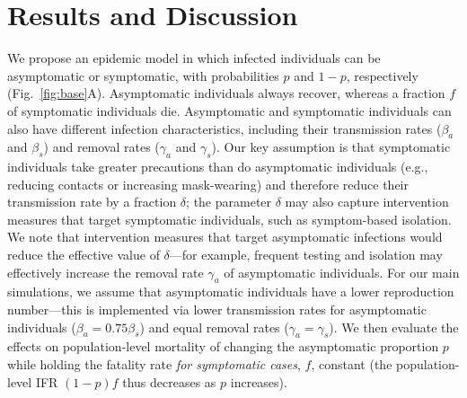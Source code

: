 \documentclass[12pt]{article}
\newcommand{\fref}[1]{Fig.~\ref{fig:#1}}
\begin{document}
\section*{Results and Discussion}

We propose an epidemic model in which infected individuals can be asymptomatic or symptomatic, with probabilities $p$ and $1-p$, respectively (\fref{base}A).  
Asymptomatic individuals always recover, whereas a fraction $f$ of symptomatic individuals die.
Asymptomatic and symptomatic individuals can also have different infection characteristics, including their transmission rates ($\beta_a$ and $\beta_s$) and removal rates ($\gamma_a$ and $\gamma_s$).
Our key assumption is that symptomatic individuals take greater precautions than do asymptomatic individuals (e.g., reducing contacts or increasing mask-wearing) and therefore reduce their transmission rate by a fraction $\delta$;
the parameter $\delta$ may also capture intervention measures that target symptomatic individuals, such as symptom-based isolation. 
We note that intervention measures that target asymptomatic infections would reduce the effective value of $\delta$---for example, frequent testing and isolation may effectively increase the removal rate $\gamma_a$ of asymptomatic individuals.
For our main simulations, we assume that asymptomatic individuals have a lower reproduction number---this is implemented via lower transmission rates for asymptomatic individuals ($\beta_a = 0.75 \beta_s$) and equal removal rates ($\gamma_a = \gamma_s$).
We then evaluate the effects on population-level mortality of changing the asymptomatic proportion $p$ while holding the fatality rate \emph{for symptomatic cases}, $f$, constant (the population-level IFR $(1-p)f$ thus decreases as $p$ increases).
\end{document}
